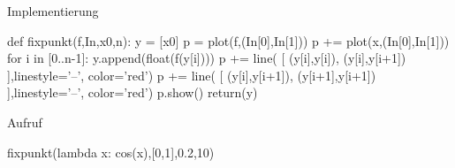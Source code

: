 \documentclass[notes=hide,hyperref={dvipdfmx,pdfpagelabels=false}]{beamer}
\begin{document}
\begin{frame}[fragile]{Implementierung}
\begin{small}
\begin{sagein}
def fixpunkt(f,In,x0,n):
    y = [x0]
    p = plot(f,(In[0],In[1]))
    p += plot(x,(In[0],In[1]))
    for i in [0..n-1]:
        y.append(float(f(y[i])))
        p += line( [ (y[i],y[i]), (y[i],y[i+1]) ],linestyle='--', color='red')
        p += line( [ (y[i],y[i+1]), (y[i+1],y[i+1]) ],linestyle='--', color='red')
    p.show()
    return(y)
\end{sagein}
\end{small}
\end{frame}

\begin{frame}[fragile]{Aufruf}
\begin{sagein}
fixpunkt(lambda x: cos(x),[0,1],0.2,10)
\end{sagein}
\begin{sage}
[0.200000000000000, 0.98006657784124163, 0.55696725280964243, 0.84886216565827077, 0.66083755111661502, 0.78947843776686832, 0.70421571334199318, 0.76211956176066087, 0.72337417210557109, 0.74957657633149311, 0.73197742525819132]
\end{sage}
\end{frame}
\end{document}
